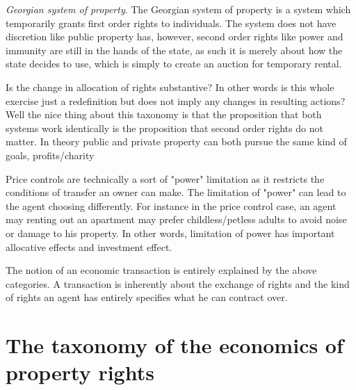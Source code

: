 \documentclass[12pt]{article}
\numberwithin{equation}{section}
\begin{document}
\textit{Georgian system of property}. The Georgian system of property is a system which temporarily grants first order rights to individuals. The system does not have discretion like public property has, however, second order rights like power and immunity are still in the hands of the state, as such it is merely about how the state decides to use, which is simply to create an auction for temporary rental.  

Is the change in allocation of rights substantive? In other words is this whole exercise just a redefinition but does not imply any changes in resulting actions? Well the nice thing about this taxonomy is that the proposition that both systems work identically is the proposition that second order rights do not matter. In theory public and private property can both pursue the same kind of goals, profits/charity


Price controls are technically a sort of "power" limitation as it restricts the conditions of transfer an owner can make. The limitation of "power" can lead to the agent choosing differently. For instance in the price control case, an agent may renting out an apartment may prefer childless/petless adults to avoid noise or damage to his property. In other words, limitation of power has important allocative effects and investment effect. 

The notion of an economic transaction is entirely explained by the above categories. A transaction is inherently about the exchange of rights and the kind of rights an agent has entirely specifies what he can contract over. 

\newpage
\section{The taxonomy of the economics of property rights}
\end{document}
